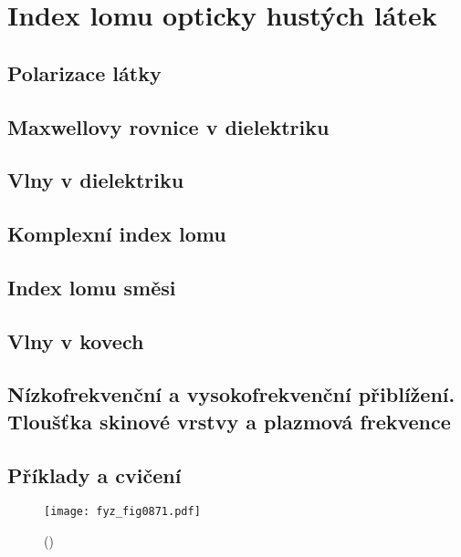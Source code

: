 \setchaptertoc
\chapter{Index lomu opticky hustých látek}\label{fyz:IIchapXXXII}

  \section{Polarizace látky}\label{fyz:IIchapXXXIIsecI}
  \section{Maxwellovy rovnice v dielektriku}\label{fyz:IIchapXXXIIsecII}
  \section{Vlny v dielektriku}\label{fyz:IIchapXXXIIsecIII}
  \section{Komplexní index lomu}\label{fyz:IIchapXXXIIsecIV}
  \section{Index lomu směsi}\label{fyz:IIchapXXXIIsecV}
  \section{Vlny v kovech}\label{fyz:IIchapXXXIIsecVI}
  \section{Nízkofrekvenční a vysokofrekvenční přiblížení. Tloušťka skinové vrstvy a 
  plazmová frekvence}\label{fyz:IIchapXXXIIsecVII}
  \section{Příklady a cvičení}\label{fyz:IIchapXXXIIsecVIII}

    \begin{figure}[ht!] %
      \centering
      \texttt{[image: fyz\_fig0871.pdf]}
      \caption{
               (\cite[s.~707]{Feynman02})}
      \label{fyz:fig0871}
    \end{figure}

